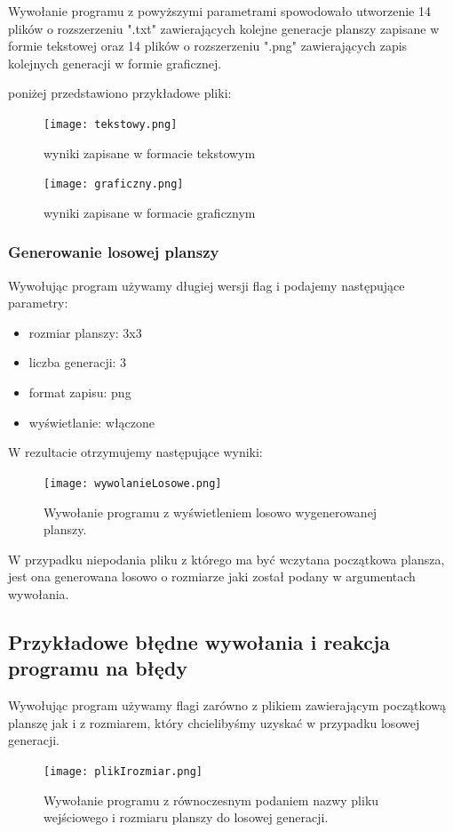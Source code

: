\documentclass[10pt, oneside]{article}
\begin{document}
\noindent Wywołanie programu z powyższymi parametrami spowodowało utworzenie 14 plików o rozszerzeniu ".txt" zawierających kolejne generacje planszy zapisane w formie tekstowej oraz 14 plików o rozszerzeniu ".png" zawierających zapis kolejnych generacji w formie graficznej.

poniżej przedstawiono przykładowe pliki:

\begin{figure}[H]
	\centering
	\texttt{[image: tekstowy.png]}
	\caption{wyniki zapisane w formacie tekstowym}
\end{figure}

\begin{figure}[H]
	\centering
	\texttt{[image: graficzny.png]}
	\caption{wyniki zapisane w formacie graficznym}
\end{figure}
\subsubsection{Generowanie losowej planszy}
\noindent Wywołując program używamy długiej wersji flag i podajemy następujące parametry: 
\begin{itemize}
  \item rozmiar planszy: 3x3
  \item liczba generacji: 3
  \item format zapisu: png
  \item wyświetlanie: włączone
\end{itemize}

\vspace{15pt} W rezultacie otrzymujemy następujące wyniki:

\begin{figure}[H]
	\centering
	\texttt{[image: wywolanieLosowe.png]}
	\caption{Wywołanie programu z wyświetleniem losowo wygenerowanej planszy.}
\end{figure}

W przypadku niepodania pliku z którego ma być wczytana początkowa plansza, jest ona generowana losowo o rozmiarze jaki został podany w argumentach wywołania.
\subsection{Przykładowe błędne wywołania i reakcja programu na błędy}
\noindent Wywołując program używamy flagi zarówno z plikiem zawierającym początkową planszę jak i z rozmiarem, który chcielibyśmy uzyskać w przypadku losowej generacji. 

\begin{figure}[H]
	\centering
	\texttt{[image: plikIrozmiar.png]}
	\caption{Wywołanie programu z równoczesnym podaniem nazwy pliku wejściowego i rozmiaru planszy do losowej generacji.}
\end{figure}
\end{document}

